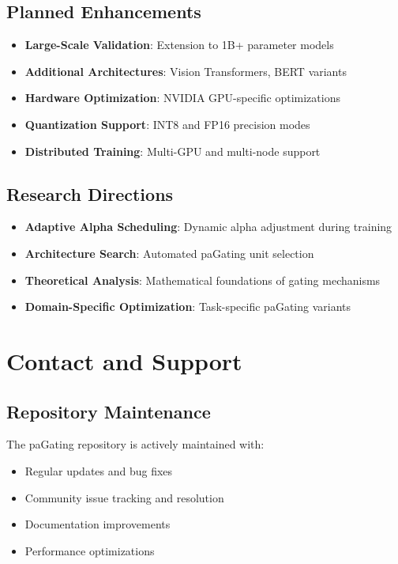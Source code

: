 \documentclass[journal]{IEEEtran}
\begin{document}
\subsection{Planned Enhancements}
\begin{itemize}
    \item \textbf{Large-Scale Validation}: Extension to 1B+ parameter models
    \item \textbf{Additional Architectures}: Vision Transformers, BERT variants
    \item \textbf{Hardware Optimization}: NVIDIA GPU-specific optimizations
    \item \textbf{Quantization Support}: INT8 and FP16 precision modes
    \item \textbf{Distributed Training}: Multi-GPU and multi-node support
\end{itemize}

\subsection{Research Directions}
\begin{itemize}
    \item \textbf{Adaptive Alpha Scheduling}: Dynamic alpha adjustment during training
    \item \textbf{Architecture Search}: Automated paGating unit selection
    \item \textbf{Theoretical Analysis}: Mathematical foundations of gating mechanisms
    \item \textbf{Domain-Specific Optimization}: Task-specific paGating variants
\end{itemize}

\section{Contact and Support}

\subsection{Repository Maintenance}
The paGating repository is actively maintained with:
\begin{itemize}
    \item Regular updates and bug fixes
    \item Community issue tracking and resolution
    \item Documentation improvements
    \item Performance optimizations
\end{itemize}
\end{document}
